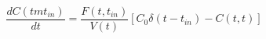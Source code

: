 \begin{equation}
\frac{dC(tmt_{in})}{dt} = \frac{F(t,t_{in})}{V(t)}[C_0\delta(t-t_{in})-C(t,t)]
\end{equation}